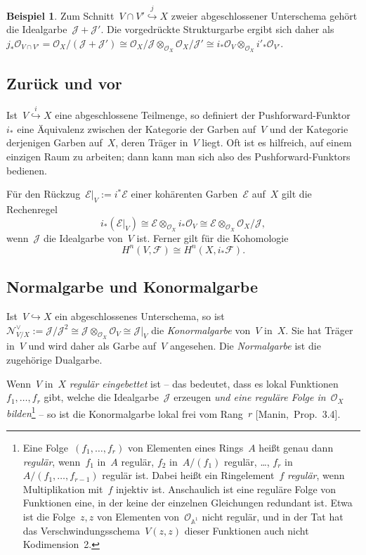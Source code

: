 \documentclass[a4paper,ngerman,12pt]{scrartcl}
\theoremstyle{definition}
\newtheorem{ex}[defn]{Beispiel}
\theoremstyle{plain}
\theoremstyle{remark}
\renewcommand{\AA}{\mathbb{A}}
\newcommand{\E}{\mathcal{E}}
\newcommand{\F}{\mathcal{F}}
\newcommand{\N}{\mathcal{N}}
\newcommand{\J}{\mathcal{J}}
\renewcommand{\O}{\mathcal{O}}
\begin{document}
\begin{ex}Zum Schnitt~$V \cap V' \stackrel{j}{\hookrightarrow} X$ zweier
abgeschlossener Unterschema gehört die Idealgarbe~$\J + \J'$. Die vorgedrückte
Strukturgarbe ergibt sich daher als~$j_*\O_{V \cap V'} = \O_X/(\J + \J') \cong
\O_X/\J \otimes_{\O_X} \O_X/\J' \cong i_*\O_V \otimes_{\O_X}
i'_*\O_{V'}$.\end{ex}


\subsection*{Zurück und vor}

Ist~$V \stackrel{i}{\hookrightarrow} X$ eine abgeschlossene Teilmenge, so
definiert der Pushforward-Funktor~$i_*$ eine Äquivalenz zwischen der Kategorie
der Garben auf~$V$ und der Kategorie derjenigen Garben auf~$X$, deren Träger
in~$V$ liegt. Oft ist es hilfreich, auf einem einzigen Raum zu arbeiten; dann
kann man sich also des Pushforward-Funktors bedienen.

Für den Rückzug~$\E|_V := i^* \E$ einer kohärenten Garben~$\E$ auf~$X$ gilt die
Rechenregel
\[ i_* (\E|_V) \cong \E \otimes_{\O_X} i_*\O_V \cong \E \otimes_{\O_X} \O_X/\J,
\]
wenn~$\J$ die Idealgarbe von~$V$ ist. Ferner gilt für die Kohomologie
\[ H^n(V, \F) \cong H^n(X, i_*\F). \]


\subsection*{Normalgarbe und Konormalgarbe}

Ist~$V \hookrightarrow X$ ein abgeschlossenes Unterschema, so ist~$\N_{V/X}^\vee
:= \J/\J^2 \cong \J \otimes_{\O_X} \O_V \cong \J|_V$ die \emph{Konormalgarbe} von~$V$ in~$X$. Sie hat Träger in~$V$ und
wird daher als Garbe auf~$V$ angesehen. Die \emph{Normalgarbe} ist die
zugehörige Dualgarbe.

Wenn~$V$ in~$X$ \emph{regulär eingebettet} ist -- das bedeutet, dass es lokal
Funktionen~$f_1,\ldots,f_r$ gibt, welche die Idealgarbe~$\J$ erzeugen \emph{und
eine reguläre Folge in~$\O_X$ bilden}\footnote{\label{fn:regulaere-folge}Eine Folge~$(f_1,\ldots,f_r)$
von Elementen eines Rings~$A$ heißt genau dann \emph{regulär}, wenn~$f_1$
in~$A$ regulär, $f_2$ in~$A/(f_1)$ regulär, \ldots, $f_r$
in~$A/(f_1,\ldots,f_{r-1})$ regulär ist. Dabei heißt ein Ringelement~$f$
\emph{regulär}, wenn Multiplikation mit~$f$ injektiv ist. Anschaulich ist eine
reguläre Folge von Funktionen eine, in der keine der einzelnen Gleichungen
redundant ist. Etwa ist die Folge~$z, z$ von Elementen von~$\O_{\AA^1}$ nicht
regulär, und in der Tat hat das Verschwindungsschema~$V(z,z)$ dieser Funktionen
auch nicht Kodimension~2.} -- so ist die Konormalgarbe lokal frei
vom Rang~$r$ [Manin,~Prop.~3.4].
\end{document}
